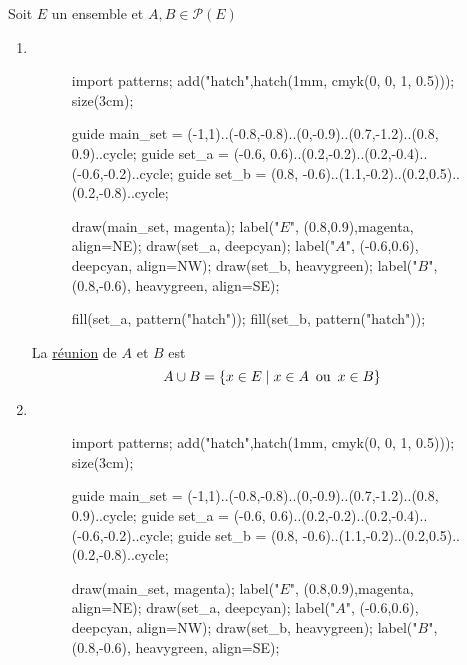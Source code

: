 \begin{defn}
	Soit $E$ un ensemble et $A, B \in \mathcal{P}(E)$
	\begin{enumerate}
		\item ~\\
			\begin{minipage}
				{\linewidth}
				\begin{wrapfigure}{r}{3cm}
					\centering
					\vspace{-7mm}
					\begin{asy}
						import patterns;
						add("hatch",hatch(1mm, cmyk(0, 0, 1, 0.5)));
						size(3cm);

						guide main_set = (-1,1)..(-0.8,-0.8)..(0,-0.9)..(0.7,-1.2)..(0.8, 0.9)..cycle;
						guide set_a = (-0.6, 0.6)..(0.2,-0.2)..(0.2,-0.4)..(-0.6,-0.2)..cycle;
						guide set_b = (0.8, -0.6)..(1.1,-0.2)..(0.2,0.5)..(0.2,-0.8)..cycle;

						draw(main_set, magenta); label("$E$", (0.8,0.9),magenta, align=NE);
						draw(set_a, deepcyan); label("$A$", (-0.6,0.6), deepcyan, align=NW);
						draw(set_b, heavygreen); label("$B$", (0.8,-0.6), heavygreen, align=SE);

						fill(set_a, pattern("hatch"));
						fill(set_b, pattern("hatch"));
					\end{asy}
				\end{wrapfigure}
				La \underline{réunion} de $A$ et $B$ est \[
					A \cup B = \{x \in E  \mid x \in A \operatorname{\text{ ou }} x \in B\}
				\]
				\index{réunion (ensemble)}
			\end{minipage}
			\vspace{2cm}
		\item ~\\
			\begin{minipage}
				{\linewidth}
				\begin{wrapfigure}{r}{3cm}
					\centering
					\vspace{-7mm}
					\begin{asy}
						import patterns;
						add("hatch",hatch(1mm, cmyk(0, 0, 1, 0.5)));
						size(3cm);

						guide main_set = (-1,1)..(-0.8,-0.8)..(0,-0.9)..(0.7,-1.2)..(0.8, 0.9)..cycle;
						guide set_a = (-0.6, 0.6)..(0.2,-0.2)..(0.2,-0.4)..(-0.6,-0.2)..cycle;
						guide set_b = (0.8, -0.6)..(1.1,-0.2)..(0.2,0.5)..(0.2,-0.8)..cycle;

						draw(main_set, magenta); label("$E$", (0.8,0.9),magenta, align=NE);
						draw(set_a, deepcyan); label("$A$", (-0.6,0.6), deepcyan, align=NW);
						draw(set_b, heavygreen); label("$B$", (0.8,-0.6), heavygreen, align=SE);


\end{asy}
\end{wrapfigure}
\end{minipage}
\end{enumerate}
\end{defn}
